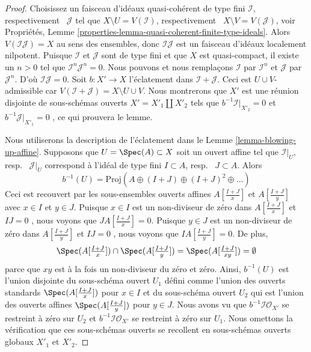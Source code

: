 \begin{proof}
Choisissez un faisceau d'idéaux quasi-cohérent de type fini  $\mathcal{I}$,
respectivement \ $\mathcal{J}$  tel que  $X \setminus U = V(\mathcal{I})$, respectivement
\ $X \setminus V = V(\mathcal{J})$, voir Propriétés, Lemme  \ref{properties-lemma-quasi-coherent-finite-type-ideals}. Alors  $V(\mathcal{I}\mathcal{J}) = X$ 
au sens des ensembles, donc  $\mathcal{I}\mathcal{J}$  est un faisceau d'idéaux localement
nilpotent. Puisque  $\mathcal{I}$  et  $\mathcal{J}$  sont de type fini et que
 $X$  est quasi-compact, il existe un  $n > 0$  tel que  $\mathcal{I}^n \mathcal{J}^n = 0$.
Nous pouvons et nous remplaçons  $\mathcal{I}$  par  $\mathcal{I}^n$  et  $\mathcal{J}$  par
 $\mathcal{J}^n$. D'où  $\mathcal{I} \mathcal{J} = 0$. Soit  $b : X' \to X$  l'éclatement dans  $\mathcal{I} + \mathcal{J}$.
Ceci est  $U \cup V$-admissible car  $V(\mathcal{I} + \mathcal{J}) = X \setminus U \cup V$. Nous montrerons que
 $X'$  est une réunion disjointe de sous-schémas ouverts  $X' = X'_1 \amalg X'_2$  tels
que  $b^{-1}\mathcal{I}|_{X'_2} = 0$  et  $b^{-1}\mathcal{J}|_{X'_1} = 0$ , ce qui prouvera le lemme.

\medskip\noindent
Nous utiliserons la description de l'éclatement dans le Lemme  \ref{lemma-blowing-up-affine}.
Supposons que  $U = \Spec(A) \subset X$  soit un ouvert affine tel que  $\mathcal{I}|_U$, resp.
\ $\mathcal{J}|_U$  correspond à l'idéal de type fini  $I \subset A$, resp.
\ $J \subset A$. Alors
$$
b^{-1}(U) = \text{Proj}(A \oplus (I + J) \oplus (I + J)^2 \oplus \ldots)
$$
Ceci est recouvert par les sous-ensembles ouverts affines  $A[\frac{I + J}{x}]$  et
 $A[\frac{I + J}{y}]$  avec  $x \in I$  et  $y \in J$. Puisque  $x \in I$  est un
non-diviseur de zéro dans  $A[\frac{I + J}{x}]$  et  $IJ = 0$ , nous voyons que
 $J A[\frac{I + J}{x}] = 0$. Puisque  $y \in J$  est un non-diviseur de zéro dans  $A[\frac{I + J}{y}]$ 
et  $IJ = 0$ , nous voyons que  $I A[\frac{I + J}{y}] = 0$. De plus,
$$
\Spec(A[\textstyle{\frac{I + J}{x}}]) \cap
\Spec(A[\textstyle{\frac{I + J}{y}}]) =
\Spec(A[\textstyle{\frac{I + J}{xy}}]) = \emptyset
$$
parce que  $xy$  est à la fois un non-diviseur du zéro et zéro. Ainsi,
 $b^{-1}(U)$  est l'union disjointe du sous-schéma ouvert  $U_1$  défini comme
l'union des ouverts standards  $\Spec(A[\frac{I + J}{x}])$  pour  $x \in I$  et du sous-schéma
ouvert  $U_2$  qui est l'union des ouverts affines  $\Spec(A[\frac{I + J}{y}])$  pour
 $y \in J$. Nous avons vu que  $b^{-1}\mathcal{I}\mathcal{O}_{X'}$  se restreint à zéro sur  $U_2$ 
et  $b^{-1}\mathcal{I}\mathcal{O}_{X'}$  se restreint à zéro sur  $U_1$. Nous omettons la
vérification que ces sous-schémas ouverts se recollent en sous-schémas ouverts
globaux  $X'_1$  et  $X'_2$.
\end{proof}


